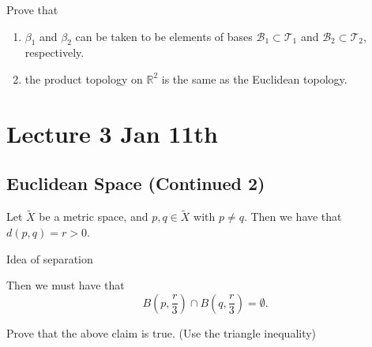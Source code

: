 \documentclass[notoc,notitlepage]{tufte-book}
\begin{document}
\begin{ex}
  Prove that
  \begin{enumerate}
    \item $\beta_1$ and $\beta_2$ can be taken to be elements of
      bases $\mathcal{B}_1 \subset \mathcal{T}_1$ and
      $\mathcal{B}_2 \subset \mathcal{T}_2$, respectively.
    \item the product topology on $\mathbb{R}^2$ is the same 
      as the Euclidean topology.
  \end{enumerate}
\end{ex}



\chapter{Lecture 3 Jan 11th}%
\label{chp:lecture_3_jan_11th}

\section{Euclidean Space (Continued 2)}%
\label{sec:euclidean_space_continued_2}


Let $\tilde{X}$ be a metric space, and $p, q \in \tilde{X}$ with $p \neq q$.
Then we have that $d(p, q) = r > 0$.
\begin{marginfigure}
  \centering
  \caption{Idea of separation}\label{fig:idea_of_separation}
\end{marginfigure}
Then we must have that
\begin{equation*}
  B \left( p, \frac{r}{3} \right) \cap B \left( q, \frac{r}{3} \right) = \emptyset.
\end{equation*}

\begin{ex}
  Prove that the above claim is true. (Use the triangle inequality)
\end{ex}
\end{document}
